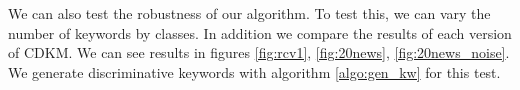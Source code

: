We can also test the robustness of our algorithm. To test this, we
can vary the number of keywords by classes. In addition we compare
the results of each version of CDKM.
We can see results  in 
figures \ref{fig:rcv1}, \ref{fig:20news}, \ref{fig:20news_noise}.
We generate discriminative keywords with algorithm \ref{algo:gen_kw}
for this test.
\begin{figure}
  \begin{subfigure}[b]{\hsize}
    \centering
  \end{subfigure}
  \begin{subfigure}[b]{\hsize}
    \centering

\end{subfigure}
\end{figure}
